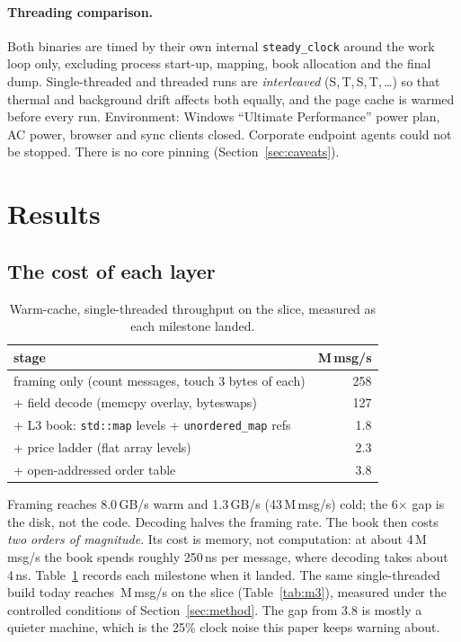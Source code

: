 \documentclass[10pt,a4paper]{article}
\newcommand{\code}[1]{\texttt{#1}}
\begin{document}
\paragraph{Threading comparison.} Both binaries are timed by their own internal \code{steady\_clock} around the work
loop only, excluding process start-up, mapping, book allocation and the final dump. Single-threaded and threaded runs are
\emph{interleaved} (S,\,T,\,S,\,T,\,\ldots) so that thermal and background drift affects both equally, and the page cache is warmed before every run.
Environment: Windows ``Ultimate Performance'' power plan, AC power, browser and sync clients closed. Corporate endpoint agents
could not be stopped. There is no core pinning (Section~\ref{sec:caveats}).

\section{Results}
\subsection{The cost of each layer}
\begin{table}[h]\centering
\caption{Warm-cache, single-threaded throughput on the slice, measured as each milestone landed.}\label{tab:stages}
\begin{tabular}{lr}\toprule
stage & M\,msg/s \\\midrule
framing only (count messages, touch 3 bytes of each) & 258 \\
+ field decode (memcpy overlay, byteswaps) & 127 \\
+ L3 book: \code{std::map} levels + \code{unordered\_map} refs & 1.8 \\
+ price ladder (flat array levels) & 2.3 \\
+ open-addressed order table & 3.8 \\\bottomrule
\end{tabular}
\end{table}
Framing reaches 8.0\,GB/s warm and 1.3\,GB/s (43\,M\,msg/s) cold; the 6$\times$ gap is the disk, not the code.
Decoding halves the framing rate. The book then costs \emph{two orders of magnitude}. Its cost is memory, not computation:
at about 4\,M\,msg/s the book spends roughly 250\,ns per message, where decoding takes about 4\,ns.
Table~\ref{tab:stages} records each milestone when it landed. The same single-threaded build today reaches \SliceSmed\,M\,msg/s on the slice
(Table~\ref{tab:m3}), measured under the controlled conditions of Section~\ref{sec:method}. The gap from 3.8 is mostly a quieter machine, which is the 25\% clock noise this paper keeps warning about.
\end{document}
